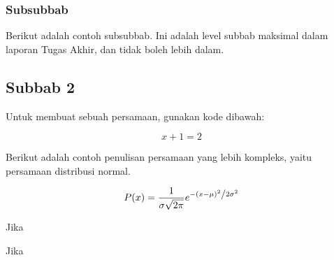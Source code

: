\subsubsection{Subsubbab} \label{II.Subsubbab1}

Berikut adalah contoh subsubbab. Ini adalah level subbab maksimal dalam laporan Tugas Akhir, dan tidak boleh lebih dalam.

\subsection{Subbab 2} \label{II.Subbab2}
Untuk membuat sebuah persamaan, gunakan kode dibawah: \par

\begin{equation}
	x + 1 = 2
\end{equation}
\label{eq:2.sum}

Berikut adalah contoh penulisan persamaan yang lebih kompleks, yaitu persamaan distribusi normal. \par

\begin{equation}
	P(x) = \frac{1}{{\sigma \sqrt {2\pi } }}e^{{{ - \left( {x - \mu } \right)^2 } \mathord{\left/ {\vphantom {{ - \left( {x - \mu } \right)^2 } {2\sigma ^2 }}} \right. \kern-\nulldelimiterspace} {2\sigma ^2 }}}
\end{equation}
\label{eq:2.normal}

Jika 

Jika 